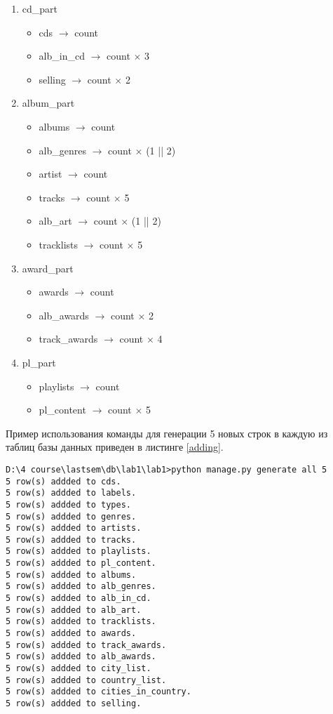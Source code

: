 \begin{enumerate}
	\item cd\_part
	\begin{itemize}
		\item cds $\rightarrow$ count
		\item alb\_in\_cd $\rightarrow$ count $\times$ 3
		\item selling $\rightarrow$ count $\times$ 2
	\end{itemize}
	\item album\_part
	\begin{itemize}
		\item albums $\rightarrow$ count
		\item alb\_genres $\rightarrow$ count $\times$ (1 || 2) 
		\item artist $\rightarrow$ count
		\item tracks $\rightarrow$ count $\times$ 5
		\item alb\_art $\rightarrow$ count $\times$ (1 || 2)
		\item tracklists $\rightarrow$ count $\times$ 5
	\end{itemize}
	\item award\_part
	\begin{itemize}
		\item awards $\rightarrow$ count
		\item alb\_awards $\rightarrow$ count $\times$ 2
		\item track\_awards $\rightarrow$ count  $\times$ 4
	\end{itemize}
	\item pl\_part
	\begin{itemize}
		\item playlists $\rightarrow$ count
		\item pl\_content $\rightarrow$ count $\times$ 5
	\end{itemize}
\end{enumerate}

Пример использования команды для генерации 5 новых строк в каждую из таблиц базы данных приведен в листинге \vref{adding}.

\begin{lstlisting}[label=adding,caption=Пример иcпользования команды]
D:\4 course\lastsem\db\lab1\lab1>python manage.py generate all 5
5 row(s) addded to cds.
5 row(s) addded to labels.
5 row(s) addded to types.
5 row(s) addded to genres.
5 row(s) addded to artists.
5 row(s) addded to tracks.
5 row(s) addded to playlists.
5 row(s) addded to pl_content.
5 row(s) addded to albums.
5 row(s) addded to alb_genres.
5 row(s) addded to alb_in_cd.
5 row(s) addded to alb_art.
5 row(s) addded to tracklists.
5 row(s) addded to awards.
5 row(s) addded to track_awards.
5 row(s) addded to alb_awards.
5 row(s) addded to city_list.
5 row(s) addded to country_list.
5 row(s) addded to cities_in_country.
5 row(s) addded to selling.
\end{lstlisting}

